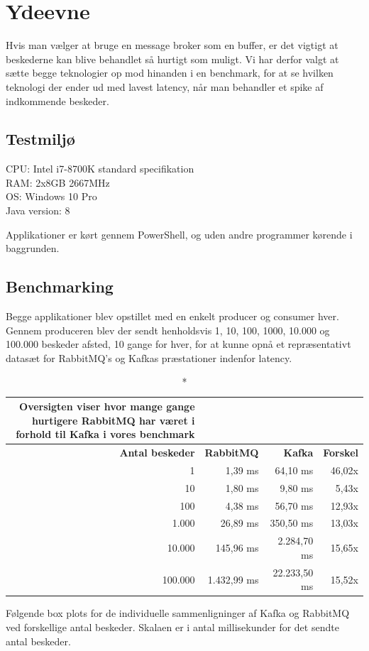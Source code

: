 \documentclass[
]{article}
\begin{document}
\hypertarget{ydeevne}{%
\section{Ydeevne}\label{ydeevne}}

Hvis man vælger at bruge en message broker som en buffer, er det vigtigt
at beskederne kan blive behandlet så hurtigt som muligt. Vi har derfor
valgt at sætte begge teknologier op mod hinanden i en benchmark, for at
se hvilken teknologi der ender ud med lavest latency, når man behandler
et spike af indkommende beskeder.

\hypertarget{testmiljuxf8}{%
\subsection{Testmiljø}\label{testmiljuxf8}}

CPU: Intel i7-8700K standard specifikation\\
RAM: 2x8GB 2667MHz\\
OS: Windows 10 Pro\\
Java version: 8

Applikationer er kørt gennem PowerShell, og uden andre programmer
kørende i baggrunden.

\hypertarget{benchmarking}{%
\subsection{Benchmarking}\label{benchmarking}}

Begge applikationer blev opstillet med en enkelt producer og consumer
hver. Gennem produceren blev der sendt henholdsvis 1, 10, 100, 1000,
10.000 og 100.000 beskeder afsted, 10 gange for hver, for at kunne opnå
et repræsentativt datasæt for RabbitMQ's og Kafkas præstationer indenfor
latency.


\begin{longtable}[]{@{}|r|r|r|r|@{}}
\caption*{Oversigten viser hvor mange gange hurtigere RabbitMQ har været i
forhold til Kafka i vores benchmark} \label{tab:long} \\
\toprule
\textbf{Antal beskeder} & \textbf{RabbitMQ} & \textbf{Kafka} &
\textbf{Forskel}\tabularnewline
\midrule
\endhead
1 & 1,39 ms & 64,10 ms & 46,02x\tabularnewline
10 & 1,80 ms & 9,80 ms & 5,43x\tabularnewline
100 & 4,38 ms & 56,70 ms & 12,93x\tabularnewline
1.000 & 26,89 ms & 350,50 ms & 13,03x\tabularnewline
10.000 & 145,96 ms & 2.284,70 ms & 15,65x\tabularnewline
100.000 & 1.432,99 ms & 22.233,50 ms & 15,52x\tabularnewline
\bottomrule
\end{longtable}
\pagebreak
Følgende box plots for de individuelle sammenligninger af Kafka og
RabbitMQ ved forskellige antal beskeder. Skalaen er i antal
millisekunder for det sendte antal beskeder.
\end{document}
